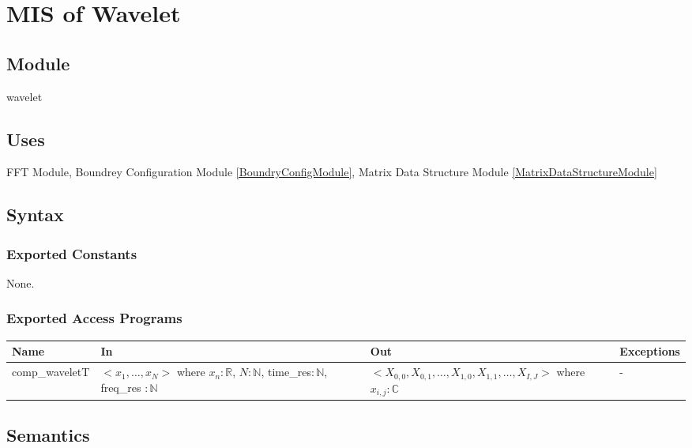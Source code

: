 \documentclass[12pt, titlepage]{article}
\begin{document}
\section{MIS of Wavelet} \label{WaveletModule} 



\subsection{Module}
wavelet

\subsection{Uses}
FFT Module, Boundrey Configuration Module \ref{BoundryConfigModule}, Matrix Data Structure Module \ref{MatrixDataStructureModule}
\subsection{Syntax}

\subsubsection{Exported Constants}
None.
\subsubsection{Exported Access Programs}

\begin{center}
\begin{tabular}{p{2.5cm} p{4cm} p{4cm} p{2cm}}
\hline
\textbf{Name} & \textbf{In} & \textbf{Out} & \textbf{Exceptions} \\
\hline
comp\_waveletT & $<x_1,\dots,x_N>$ where $ x_n:\mathbb{R}$, $N:\mathbb{N}$, time\_res$:\mathbb{N}$, freq\_res $:\mathbb{N}$ & $<X_{0,0},X_{0,1},\dots, X_{1,0},X_{1,1},\dots, X_{I,J}>$ where $ x_{i,j}:\mathbb{C}$ & - \\
\hline
\end{tabular}
\end{center}

\subsection{Semantics}
\end{document}
